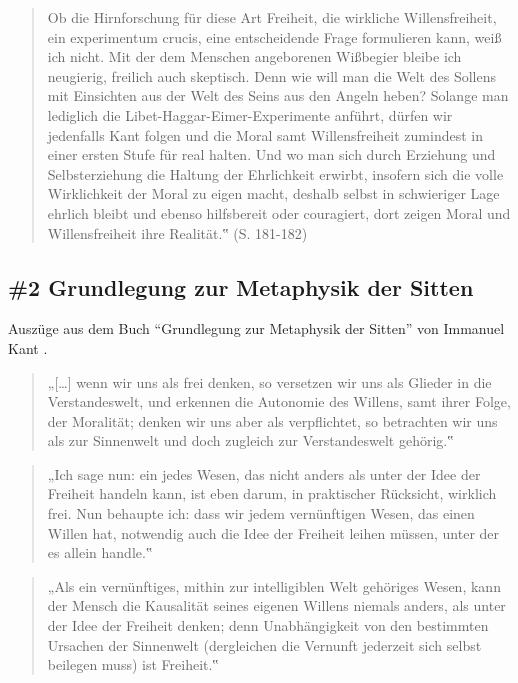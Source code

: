 \documentclass[
  a4paper,
]{report}
\begin{document}
\begin{quote}
Ob die Hirnforschung für diese Art Freiheit, die wirkliche Willensfreiheit, ein experimentum crucis, eine entscheidende Frage formulieren kann, weiß ich nicht. Mit der dem Menschen angeborenen Wißbegier bleibe ich neugierig, freilich auch skeptisch. Denn wie will man die Welt des Sollens mit Einsichten aus der Welt des Seins aus den Angeln heben? Solange man lediglich die Libet-Haggar-Eimer-Experimente anführt, dürfen wir jedenfalls Kant folgen und die Moral samt Willensfreiheit zumindest in einer ersten Stufe für real halten. Und wo man sich durch Erziehung und Selbsterziehung die Haltung der Ehrlichkeit erwirbt, insofern sich die volle Wirklichkeit der Moral zu eigen macht, deshalb selbst in schwieriger Lage ehrlich bleibt und ebenso hilfsbereit oder couragiert, dort zeigen Moral und Willensfreiheit ihre Realität.‟ (S. 181-182)
\end{quote}

\hypertarget{pr-expert-ev2}{%
\subsection{\#2 Grundlegung zur Metaphysik der Sitten}\label{pr-expert-ev2}}

Auszüge aus dem Buch ``Grundlegung zur Metaphysik der Sitten'' von Immanuel Kant \citeyearpar{Kant1785}.

\begin{quote}
„{[}\ldots{]} wenn wir uns als frei denken, so versetzen wir uns als Glieder in die Verstandeswelt, und erkennen die Autonomie des Willens, samt ihrer Folge, der Moralität; denken wir uns aber als verpflichtet, so betrachten wir uns als zur Sinnenwelt und doch zugleich zur Verstandeswelt gehörig.‟
\end{quote}

\begin{quote}
„Ich sage nun: ein jedes Wesen, das nicht anders als unter der Idee der Freiheit handeln kann, ist eben darum, in praktischer Rücksicht, wirklich frei. Nun behaupte ich: dass wir jedem vernünftigen Wesen, das einen Willen hat, notwendig auch die Idee der Freiheit leihen müssen, unter der es allein handle.‟
\end{quote}

\begin{quote}
„Als ein vernünftiges, mithin zur intelligiblen Welt gehöriges Wesen, kann der Mensch die Kausalität seines eigenen Willens niemals anders, als unter der Idee der Freiheit denken; denn Unabhängigkeit von den bestimmten Ursachen der Sinnenwelt (dergleichen die Vernunft jederzeit sich selbst beilegen muss) ist Freiheit.‟
\end{quote}
\end{document}
